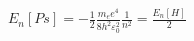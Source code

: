 \documentclass[preview]{standalone}
\begin{document}
\begin{center}
$E_n [Ps] = - \frac{1}{2} \frac{m_e e^4}{8h^2 \varepsilon_0^2}\frac{1}{n^2} = \frac{E_n[H]}{2}$
\end{center}
\end{document}
